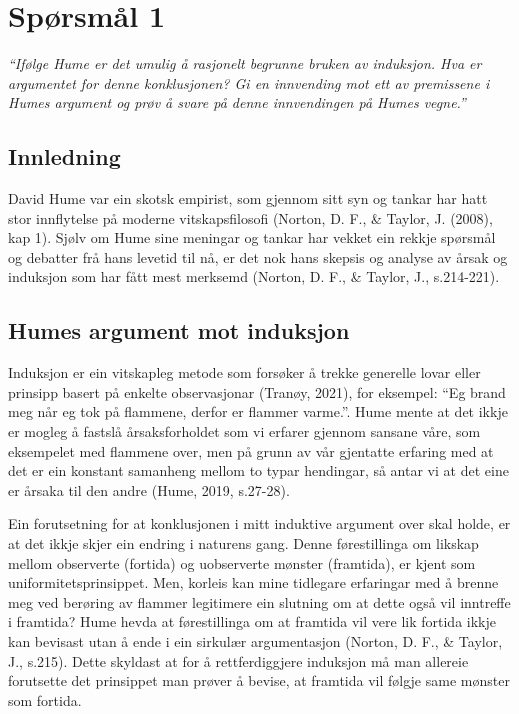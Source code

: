 \documentclass[
  letterpaper,
  DIV=11,
  numbers=noendperiod]{scrreprt}
\begin{document}
\section{Spørsmål 1}\label{spuxf8rsmuxe5l-1}

\emph{``Ifølge Hume er det umulig å rasjonelt begrunne bruken av
induksjon. Hva er argumentet for denne konklusjonen? Gi en innvending
mot ett av premissene i Humes argument og prøv å svare på denne
innvendingen på Humes vegne.''}

\subsection{Innledning}\label{innledning-1}

David Hume var ein skotsk empirist, som gjennom sitt syn og tankar har
hatt stor innflytelse på moderne vitskapsfilosofi (Norton, D. F., \&
Taylor, J. (2008), kap 1). Sjølv om Hume sine meningar og tankar har
vekket ein rekkje spørsmål og debatter frå hans levetid til nå, er det
nok hans skepsis og analyse av årsak og induksjon som har fått mest
merksemd (Norton, D. F., \& Taylor, J., s.214-221).

\subsection{Humes argument mot
induksjon}\label{humes-argument-mot-induksjon}

Induksjon er ein vitskapleg metode som forsøker å trekke generelle lovar
eller prinsipp basert på enkelte observasjonar (Tranøy, 2021), for
eksempel: ``Eg brand meg når eg tok på flammene, derfor er flammer
varme.''. Hume mente at det ikkje er mogleg å fastslå årsaksforholdet
som vi erfarer gjennom sansane våre, som eksempelet med flammene over,
men på grunn av vår gjentatte erfaring med at det er ein konstant
samanheng mellom to typar hendingar, så antar vi at det eine er årsaka
til den andre (Hume, 2019, s.27-28).

Ein forutsetning for at konklusjonen i mitt induktive argument over skal
holde, er at det ikkje skjer ein endring i naturens gang. Denne
førestillinga om likskap mellom observerte (fortida) og uobserverte
mønster (framtida), er kjent som uniformitetsprinsippet. Men, korleis
kan mine tidlegare erfaringar med å brenne meg ved berøring av flammer
legitimere ein slutning om at dette også vil inntreffe i framtida? Hume
hevda at førestillinga om at framtida vil vere lik fortida ikkje kan
bevisast utan å ende i ein sirkulær argumentasjon (Norton, D. F., \&
Taylor, J., s.215). Dette skyldast at for å rettferdiggjere induksjon må
man allereie forutsette det prinsippet man prøver å bevise, at framtida
vil følgje same mønster som fortida.
\end{document}
